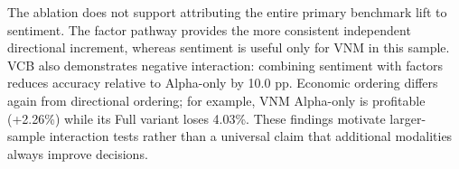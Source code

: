 The ablation does not support attributing the entire primary benchmark lift to sentiment. The factor pathway provides the more consistent independent directional increment, whereas sentiment is useful only for VNM in this sample. VCB also demonstrates negative interaction: combining sentiment with factors reduces accuracy relative to Alpha-only by 10.0 pp. Economic ordering differs again from directional ordering; for example, VNM Alpha-only is profitable (+2.26\%) while its Full variant loses 4.03\%. These findings motivate larger-sample interaction tests rather than a universal claim that additional modalities always improve decisions.
